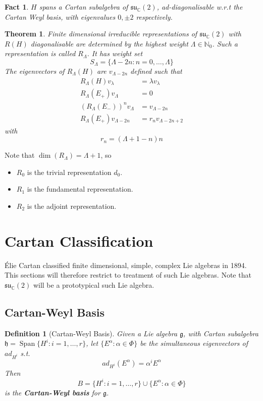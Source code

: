 \documentclass{article}
\newtheorem{theorem}{Theorem}[subsection]
\newtheorem{definition}{Definition}[subsection]
\newtheorem{fact}{Fact}[subsection]
\DeclareMathOperator{\spn}{Span}
\newcommand{\bam}[1]{\textbf{#1}}
\newcommand{\mf}[1]{\mathfrak{#1}}
\newcommand{\mbb}[1]{\mathbb{#1}}
\begin{document}
\begin{fact}
$H$ spans a Cartan subalgebra of $\mf{su}_\mbb{C}(2)$, ad-diagonalisable w.r.t the Cartan Weyl basis, with eigenvalues $0, \pm 2$ respectively. 
\end{fact}

\begin{theorem}
Finite dimensional irreducible representations of $\mf{su}_\mbb{C}(2)$ with $R(H)$ diagonalisable are determined by the highest weight $\Lambda\in\mbb{N}_0$. Such a representation is called $R_\Lambda$. It has weight set 
\[
S_\Lambda=\lbrace \Lambda-2n : n=0,\dots,\Lambda \rbrace
\]
The eigenvectors of $R_\Lambda(H)$ are $v_{\Lambda-2n}$ defined such that 
\begin{align*}
R_\Lambda(H) v_\lambda &= \lambda v_\lambda \\
R_\Lambda(E_+) v_\Lambda &= 0 \\
 \left(R_\Lambda(E_-)\right)^n v_{\Lambda} &= v_{\Lambda-2n} \\
 R_\Lambda(E_+) v_{\Lambda-2n} &= r_n v_{\Lambda-2n+2}
\end{align*}
with 
\[
r_n=(\Lambda+1-n)n
\]
\end{theorem}
Note that $\dim(R_\Lambda)=\Lambda+1$, so 
\begin{itemize}
    \item $R_0$ is the trivial representation $d_0$.
    \item $R_1$ is the fundamental representation.
    \item $R_2$ is the adjoint representation. 
\end{itemize}
\section{Cartan Classification}
\'Elie Cartan classified finite dimensional, simple, complex Lie algebras in 1894. This sections will therefore restrict to treatment of such Lie algebras. Note that $\mf{su}_\mbb{C}(2)$ will be a prototypical such Lie algebra. 

\subsection{Cartan-Weyl Basis}

\begin{definition}[Cartan-Weyl Basis]
Given a Lie algebra $\mf{g}$, with Cartan subalgebra $\mf{h}=\spn\lbrace H^i : i=1,\dots,r\rbrace$, let $\lbrace E^\alpha : \alpha\in\Phi \rbrace$ be the simultaneous eigenvectors of $ad_{H^i}$ s.t. 
\[
ad_{H^i}\left(E^\alpha \right)=\alpha^i E^\alpha
\]
Then 
\[
B=\lbrace H^i : i=1,\dots,r\rbrace \cup \lbrace E^\alpha : \alpha\in\Phi \rbrace
\]
is the \bam{Cartan-Weyl basis} for $\mf{g}$.
\end{definition}
\end{document}

